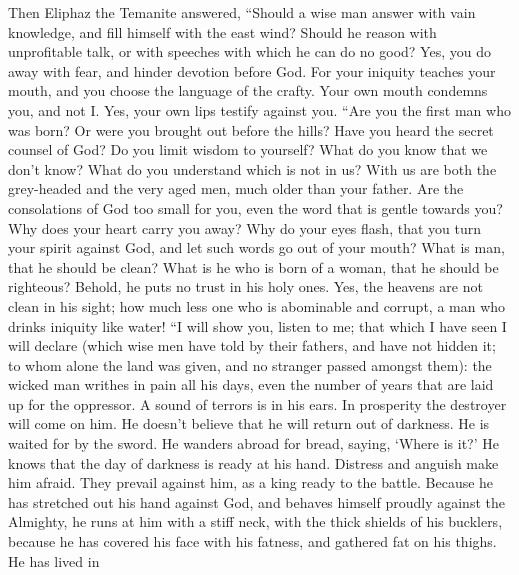  Then Eliphaz the Temanite answered,  ``Should a
wise man answer with vain knowledge, and fill himself with the east
wind?  Should he reason with unprofitable talk, or with
speeches with which he can do no good?  Yes, you do away
with fear, and hinder devotion before God.  For your
iniquity teaches your mouth, and you choose the language of the crafty.
 Your own mouth condemns you, and not I. Yes, your own lips
testify against you.  ``Are you the first man who was born?
Or were you brought out before the hills?  Have you heard
the secret counsel of God? Do you limit wisdom to yourself? 
What do you know that we don't know? What do you understand which is not
in us?  With us are both the grey-headed and the very aged
men, much older than your father.  Are the consolations of
God too small for you, even the word that is gentle towards you?
 Why does your heart carry you away? Why do your eyes
flash,  that you turn your spirit against God, and let such
words go out of your mouth?  What is man, that he should be
clean? What is he who is born of a woman, that he should be righteous?
 Behold, he puts no trust in his holy ones. Yes, the
heavens are not clean in his sight;  how much less one who
is abominable and corrupt, a man who drinks iniquity like water!
 ``I will show you, listen to me; that which I have seen I
will declare  (which wise men have told by their fathers,
and have not hidden it;  to whom alone the land was given,
and no stranger passed amongst them):  the wicked man
writhes in pain all his days, even the number of years that are laid up
for the oppressor.  A sound of terrors is in his ears. In
prosperity the destroyer will come on him.  He doesn't
believe that he will return out of darkness. He is waited for by the
sword.  He wanders abroad for bread, saying, `Where is it?'
He knows that the day of darkness is ready at his hand. 
Distress and anguish make him afraid. They prevail against him, as a
king ready to the battle.  Because he has stretched out his
hand against God, and behaves himself proudly against the Almighty,
 he runs at him with a stiff neck, with the thick shields
of his bucklers,  because he has covered his face with his
fatness, and gathered fat on his thighs.  He has lived in
